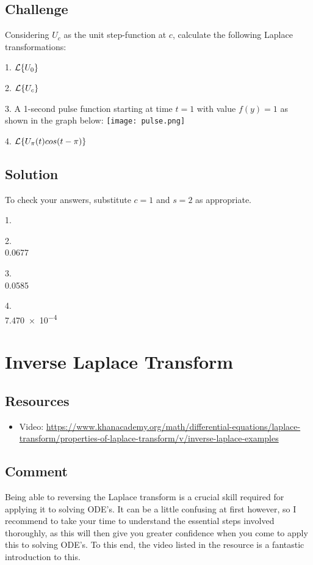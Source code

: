 \subsection*{Challenge}
Considering $U_c$ as the unit step-function at $c$, calculate the following Laplace transformations:

1. $\displaystyle \mathcal{L}\{U_0\}$

2. $\displaystyle \mathcal{L}\{U_c\}$

3. A 1-second pulse function starting at time $t=1$ with value $f(y)=1$ as shown in the graph below:
\texttt{[image: pulse.png]}

4. $\displaystyle \mathcal{L}\{U_\pi(t) cos(t-\pi)\}$

\subsection*{Solution}
To check your answers, substitute $c=1$ and $s=2$ as appropriate.

1.\\

2.\\
0.0677

3.\\
0.0585

4.\\
\num{7.470e-4}




\newpage
\section{Inverse Laplace Transform}

\subsection*{Resources}
\begin{itemize}
    \item Video: \url{https://www.khanacademy.org/math/differential-equations/laplace-transform/properties-of-laplace-transform/v/inverse-laplace-examples} %
\end{itemize}

\subsection*{Comment}
Being able to reversing the Laplace transform is a crucial skill required for applying it to solving ODE's. It can be a little confusing at first however, so I recommend to take your time to understand the essential steps involved thoroughly, as this will then give you greater confidence when you come to apply this to solving ODE's. To this end, the video listed in the resource is a fantastic introduction to this.

